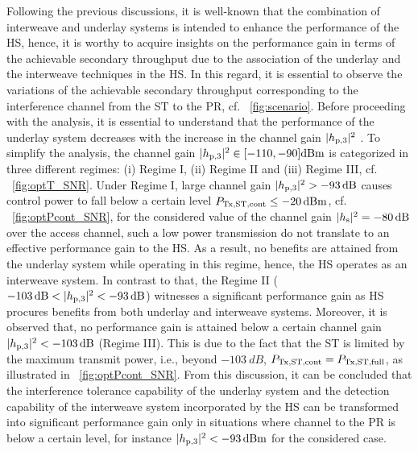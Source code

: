 Following the previous discussions, it is well-known that the combination of interweave and underlay systems is intended to enhance the performance of the HS, hence, it is worthy to acquire insights on the performance gain in terms of the achievable secondary throughput due to the association of the underlay and the interweave techniques in the HS. In this regard, it is essential to observe the variations of the achievable secondary throughput corresponding to the interference channel from the ST to the PR, cf. \figurename~\ref{fig:scenario}. Before proceeding with the analysis, it is essential to understand that the performance of the underlay system decreases with the increase in the channel gain $|h_{\text{p,3}}|^2$ \cite{Kaushik16_CL}. To simplify the analysis, the channel gain $|h_{\text{p,3}}|^2 \in [-110, -90] \SI{}{dBm}$ is categorized in three different regimes: (i) Regime I, (ii) Regime II and (iii) Regime III, cf. \figurename~\ref{fig:optT_SNR}. Under Regime I, large channel gain $|h_{\text{p,3}}|^2 > -\SI{93}{dB}$ causes control power to fall below a certain level $P_{\text{Tx,ST,cont}} \le \SI{-20}{dBm}$, cf. \figurename~\ref{fig:optPcont_SNR}, for the considered value of the channel gain $|h_{\text{s}}|^2 = \SI{-80}{dB}$ over the access channel, such a low power transmission do not translate to an effective performance gain to the HS. As a result, no benefits are attained from the underlay system while operating in this regime, hence, the HS operates as an interweave system. In contrast to that, the Regime II ($-\SI{103}{dB} < |h_{\text{p,3}}|^2 < -\SI{93}{dB}$) witnesses a significant performance gain as HS procures benefits from both underlay and interweave systems. Moreover, it is observed that, no performance gain is attained below a certain channel gain $|h_{\text{p,3}}|^2 < \SI{-103}{dB}$ (Regime III). This is due to the fact that the ST is limited by the maximum transmit power, i.e., beyond $\SI{-103}{dB}$, $P_{\text{Tx,ST,cont}} = P_{\text{Tx,ST,full}}$, as illustrated in \figurename~\ref{fig:optPcont_SNR}. From this discussion, it can be concluded that the interference tolerance capability of the underlay system and the detection capability of the interweave system incorporated by the HS can be transformed into significant performance gain only in situations where channel to the PR is below a certain level, for instance $|h_{\text{p,3}}|^2 < -\SI{93}{dBm}$ for the considered case.



